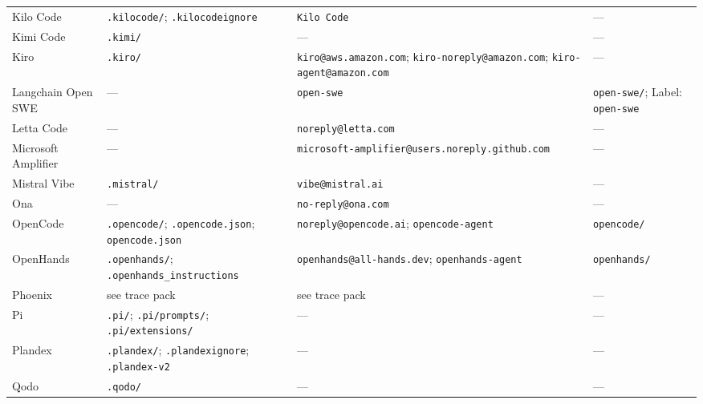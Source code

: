 \begin{small}
\begin{longtable}{@{}p{2.8cm}p{3.8cm}p{4.8cm}p{3.1cm}@{}}
Kilo Code       & \texttt{.kilocode/}; \texttt{.kilocodeignore} & \texttt{Kilo Code}                                                          & --- \\
Kimi Code       & \texttt{.kimi/}                               & ---                                                                         & --- \\
Kiro            & \texttt{.kiro/}                               & \texttt{kiro@aws.amazon.com}; \texttt{kiro-noreply@amazon.com}; \texttt{kiro-agent@amazon.com} & --- \\
Langchain Open SWE & ---                                        & \texttt{open-swe}                                                           & \texttt{open-swe/}; Label: \texttt{open-swe} \\
Letta Code      & ---                                           & \texttt{noreply@letta.com}                                                  & --- \\
Microsoft Amplifier & ---                                       & \texttt{microsoft-amplifier@users.noreply.github.com}                       & --- \\
Mistral Vibe    & \texttt{.mistral/}                            & \texttt{vibe@mistral.ai}                                                    & --- \\
Ona             & ---                                           & \texttt{no-reply@ona.com}                                                   & --- \\
OpenCode        & \texttt{.opencode/}; \texttt{.opencode.json}; \texttt{opencode.json} & \texttt{noreply@opencode.ai}; \texttt{opencode-agent}  & \texttt{opencode/} \\
OpenHands       & \texttt{.openhands/}; \texttt{.openhands\_instructions} & \texttt{openhands@all-hands.dev}; \texttt{openhands-agent}       & \texttt{openhands/} \\
Phoenix         & see trace pack                                & see trace pack                                                              & --- \\
Pi              & \texttt{.pi/}; \texttt{.pi/prompts/}; \texttt{.pi/extensions/} & ---                                                     & --- \\
Plandex         & \texttt{.plandex/}; \texttt{.plandexignore}; \texttt{.plandex-v2} & ---                                                    & --- \\
Qodo            & \texttt{.qodo/}                               & ---                                                                         & --- \\

\end{longtable}
\end{small}
